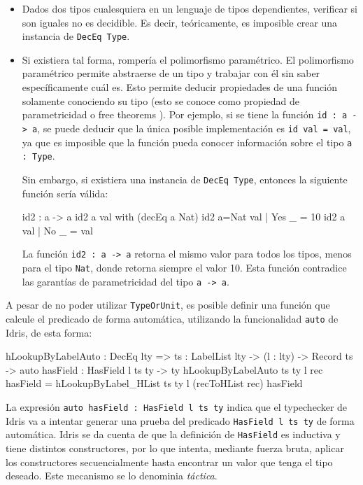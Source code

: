 \begin{itemize}
\item Dados dos tipos cualesquiera en un lenguaje de tipos dependientes, verificar si son iguales no es decidible. Es decir, teóricamente, es imposible crear una instancia de \texttt{DecEq Type}.
\item Si existiera tal forma, rompería el polimorfismo paramétrico. El polimorfismo paramétrico permite abstraerse de un tipo y trabajar con él sin saber específicamente cuál es. Esto permite deducir propiedades de una función solamente conociendo su tipo (esto se conoce como propiedad de parametricidad o free theorems \cite{Wadler:1989:TF:99370.99404}). Por ejemplo, si se tiene la función \texttt{id : a -> a}, se puede deducir que la única posible implementación es \texttt{id val = val}, ya que es imposible que la función pueda conocer información sobre el tipo \texttt{a : Type}.

Sin embargo, si existiera una instancia de \texttt{DecEq Type}, entonces la siguiente función sería válida:

\begin{code}
id2 : a -> a
id2 {a} val with (decEq a Nat)
  id2 {a=Nat} val | Yes _ = 10
  id2 {a} val | No _ = val
\end{code}

La función \texttt{id2 : a -> a} retorna el mismo valor para todos los tipos, menos para el tipo \texttt{Nat}, donde retorna siempre el valor 10. Esta función contradice las garantías de parametricidad del tipo \texttt{a -> a}.
\end{itemize}

A pesar de no poder utilizar \texttt{TypeOrUnit}, es posible definir una función que calcule el predicado de forma automática, utilizando la funcionalidad \texttt{auto} de Idris, de esta forma:

\begin{code}
hLookupByLabelAuto : DecEq lty => {ts : LabelList lty} ->
  (l : lty) -> Record ts ->
  {auto hasField : HasField l ts ty} -> ty
hLookupByLabelAuto {ts} {ty} l rec {hasField} =
  hLookupByLabel_HList {ts} {ty} l (recToHList rec) hasField
\end{code}

La expresión \texttt{auto hasField : HasField l ts ty} indica que el typechecker de Idris va a intentar generar una prueba del predicado \texttt{HasField l ts ty} de forma automática. Idris se da cuenta de que la definición de \texttt{HasField} es inductiva y tiene distintos constructores, por lo que intenta, mediante fuerza bruta, aplicar los constructores secuencialmente hasta encontrar un valor que tenga el tipo deseado. Este mecanismo se lo denominia \textit{táctica}.

